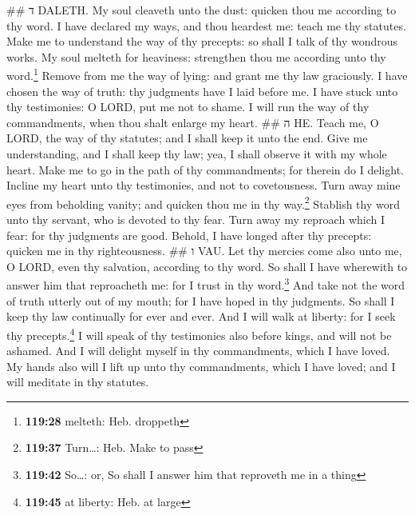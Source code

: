 \#\# ד DALETH.  My soul cleaveth unto the dust: quicken
thou me according to thy word.  I have declared my ways,
and thou heardest me: teach me thy statutes.  Make me to
understand the way of thy precepts: so shall I talk of thy wondrous
works.  My soul melteth for heaviness: strengthen thou me
according unto thy word.\footnote{\textbf{119:28} melteth: Heb. droppeth}
 Remove from me the way of lying: and grant me thy law
graciously.  I have chosen the way of truth: thy
judgments have I laid before me.  I have stuck unto thy
testimonies: O LORD, put me not to shame.  I will run the
way of thy commandments, when thou shalt enlarge my heart. \#\# ה HE.
 Teach me, O LORD, the way of thy statutes; and I shall
keep it unto the end.  Give me understanding, and I shall
keep thy law; yea, I shall observe it with my whole heart.
 Make me to go in the path of thy commandments; for
therein do I delight.  Incline my heart unto thy
testimonies, and not to covetousness.  Turn away mine
eyes from beholding vanity; and quicken thou me in thy way.\footnote{\textbf{119:37}
  Turn\ldots: Heb. Make to pass}  Stablish thy word unto
thy servant, who is devoted to thy fear.  Turn away my
reproach which I fear: for thy judgments are good. 
Behold, I have longed after thy precepts: quicken me in thy
righteousness. \#\# ו VAU.  Let thy mercies come also
unto me, O LORD, even thy salvation, according to thy word.
 So shall I have wherewith to answer him that reproacheth
me: for I trust in thy word.\footnote{\textbf{119:42} So\ldots: or, So
  shall I answer him that reproveth me in a thing}  And
take not the word of truth utterly out of my mouth; for I have hoped in
thy judgments.  So shall I keep thy law continually for
ever and ever.  And I will walk at liberty: for I seek
thy precepts.\footnote{\textbf{119:45} at liberty: Heb. at large}
 I will speak of thy testimonies also before kings, and
will not be ashamed.  And I will delight myself in thy
commandments, which I have loved.  My hands also will I
lift up unto thy commandments, which I have loved; and I will meditate
in thy statutes.


